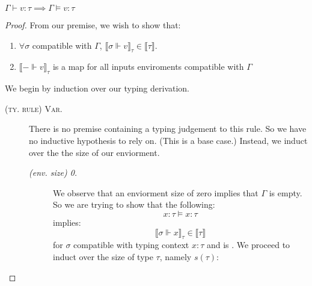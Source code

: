\begin{theorem}
$\Gamma \vdash v : \tau \implies \Gamma \vDash v : \tau$
\end{theorem}
\begin{proof}
From our premise, we wish to show that:
  \begin{enumerate}
    \item $\forall \sigma$ compatible with $\Gamma$, $\llbracket \sigma \Vdash v
      \rrbracket_{\tau} \in \llbracket \tau \rrbracket$.
    \item $\llbracket - \Vdash v
      \rrbracket_{\tau}$ is a  map for all inputs enviroments
      compatible with $\Gamma$
  \end{enumerate}
We begin by induction over our typing derivation. 
\begin{description}
  \item[\textsc{(ty. rule) Var.}] There is no premise containing a typing
    judgement to this rule. So we have no inductive hypothesis to rely on.
    (This is a base case.)
    Instead, we induct over the the size of our enviorment.
    \begin{description}
      \item[\textit{(env. size) 0.}] We observe that an enviorment size of zero
        implies that $\Gamma$ is empty. So we are trying to show that the
        following:
        $$x : \tau \vDash x : \tau$$
        implies:
        $$\llbracket \sigma \Vdash x \rrbracket_\tau \in \llbracket \tau
        \rrbracket$$
        for $\sigma$ compatible with typing context $x : \tau$ and is
        . We proceed to induct over the size of type $\tau$,
        namely $s(\tau)$:
\end{description}
\end{description}
\end{proof}
